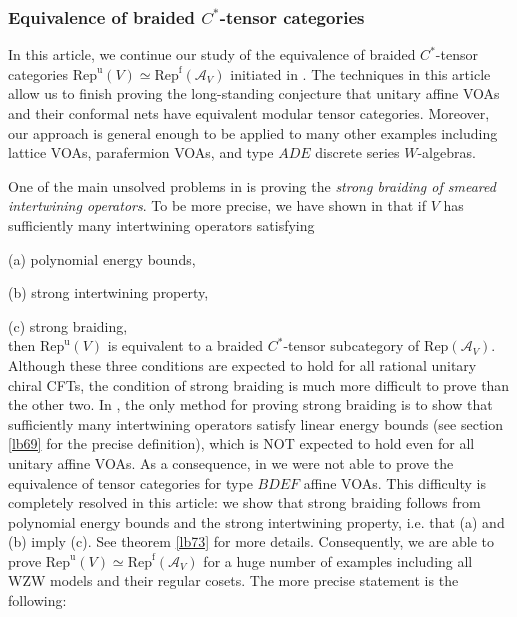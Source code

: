 \documentclass[12pt,a4paper]{article}
\theoremstyle{definition}
\theoremstyle{plain}
\newcommand{\mc}{\mathcal}
\newcommand{\Rep}{\mathrm{Rep}}
\newcommand{\Repu}{\mathrm{Rep}^{\mathrm u}}
\newcommand{\Repf}{\mathrm{Rep}^{\mathrm f}}
\newcommand{\RepuV}{\mathrm{Rep}^{\mathrm u}(V)}
\numberwithin{equation}{subsection}
\begin{document}
\subsubsection*{Equivalence of braided $C^*$-tensor categories}



In this article, we continue our study of the equivalence of braided  $C^*$-tensor categories $\RepuV\simeq\Repf(\mc A_V)$ initiated in \cite{Gui21a}. The techniques in this article allow us to finish proving the long-standing conjecture that unitary affine VOAs and their conformal nets have equivalent modular tensor categories. Moreover, our approach is general enough to be applied to many other examples  including lattice VOAs, parafermion VOAs, and type $ADE$ discrete series $W$-algebras.

One of the main unsolved problems in \cite{Gui21a} is proving the \emph{strong braiding of smeared intertwining operators}. To be more precise, we have shown in \cite{Gui21a}  that if $V$ has sufficiently many intertwining operators satisfying 

(a) polynomial energy bounds, 

(b) strong intertwining property,

(c) strong braiding,\\
then $\RepuV$ is equivalent to a braided $C^*$-tensor subcategory of $\Rep(\mc A_V)$. Although these three conditions are expected to hold for all rational unitary chiral CFTs, the condition of strong braiding is much more difficult to prove than the other two. In \cite{Gui21a}, the only method for proving strong braiding is to show that sufficiently many intertwining operators satisfy linear energy bounds (see section \ref{lb69} for the precise definition), which is NOT expected to hold even for all unitary affine VOAs. As a consequence, in \cite{Gui21a} we were not able to prove  the equivalence of tensor categories for type $BDEF$ affine VOAs. This difficulty is completely resolved in this article: we show that strong braiding follows from polynomial energy bounds and the strong intertwining property, i.e. that (a) and (b) imply (c). See theorem \ref{lb73} for more details. Consequently, we are able to prove $\Repu(V)\simeq\Repf(\mc A_V)$ for a huge number of examples including all WZW models and their regular cosets. The more precise statement is the following:
\end{document}
